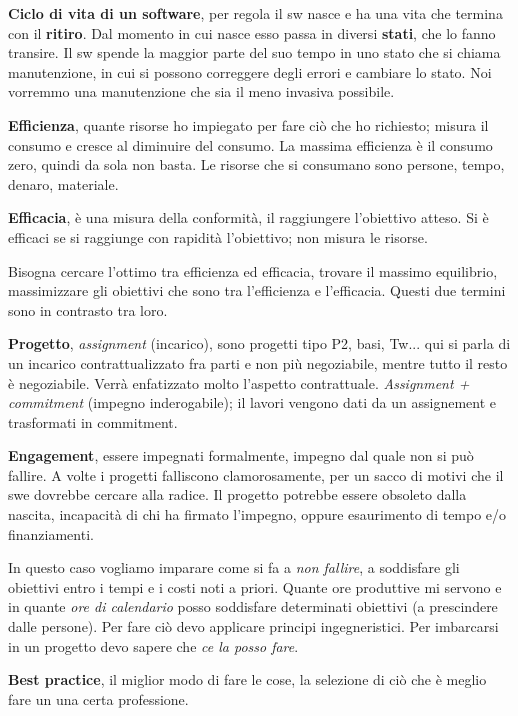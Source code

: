 \textbf{Ciclo di vita di un software}, per regola il sw nasce e ha una vita che termina con il \textbf{ritiro}. Dal momento in cui nasce esso passa in diversi \textbf{stati}, che lo fanno transire. Il sw spende la maggior parte del suo tempo in uno stato che si chiama manutenzione, in cui si possono correggere degli errori e cambiare lo stato. Noi vorremmo una manutenzione che sia il meno invasiva possibile.

\textbf{Efficienza}, quante risorse ho impiegato per fare ciò che ho richiesto; misura il consumo e cresce al diminuire del consumo. La massima efficienza è il consumo zero, quindi da sola non basta. Le risorse che si consumano sono persone, tempo, denaro, materiale.

\textbf{Efficacia}, è una misura della conformità, il raggiungere l'obiettivo atteso. Si è efficaci se si raggiunge con rapidità l'obiettivo; non misura le risorse.

Bisogna cercare l'ottimo tra efficienza ed efficacia, trovare il massimo equilibrio, massimizzare gli obiettivi che sono tra l'efficienza e l'efficacia. Questi due termini sono in contrasto tra loro.

\textbf{Progetto}, \textit{assignment} (incarico), sono progetti tipo P2, basi, Tw... qui si parla di un incarico contrattualizzato fra parti e non più negoziabile, mentre tutto il resto è negoziabile. Verrà enfatizzato molto l'aspetto contrattuale. \textit{Assignment + commitment} (impegno inderogabile); il lavori vengono dati da un assignement e trasformati in commitment.

\textbf{Engagement}, essere impegnati formalmente, impegno dal quale non si può fallire. A volte i progetti falliscono clamorosamente, per un sacco di motivi che il swe dovrebbe cercare alla radice. Il progetto potrebbe essere obsoleto dalla nascita, incapacità di chi ha firmato l'impegno, oppure esaurimento di tempo e/o finanziamenti. 

In questo caso vogliamo imparare come si fa a \textit{non fallire}, a soddisfare gli obiettivi entro i tempi e i costi noti a priori. Quante ore produttive mi servono e in quante \textit{ore di calendario} posso soddisfare determinati obiettivi (a prescindere dalle persone). Per fare ciò devo applicare principi ingegneristici. Per imbarcarsi in un progetto devo sapere che \textit{ce la posso fare}.

\textbf{Best practice}, il miglior modo di fare le cose, la selezione di ciò che è meglio fare un una certa professione.

